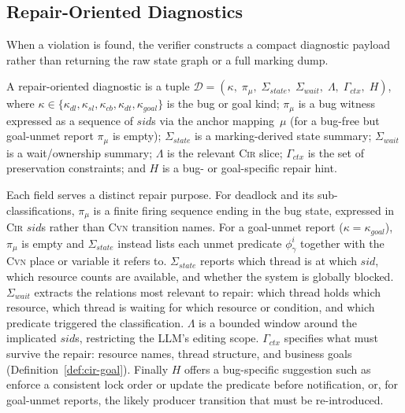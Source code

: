 \subsection{Repair-Oriented Diagnostics}
\label{subsec:counterexample}

When a violation is found, the verifier constructs a compact diagnostic
payload rather than returning the raw state graph or a full marking
dump.

\begin{definition}
\label{def:diagnostic}
A repair-oriented diagnostic is a tuple
$\mathcal{D}=(\kappa,\;\pi_{\mu},\;\Sigma_{\mathit{state}},\;
  \Sigma_{\mathit{wait}},\;\Lambda,\;\Gamma_{\mathit{ctx}},\;H)$,
where
$\kappa\in\{\kappa_{dl},\kappa_{sl},\kappa_{cb},\kappa_{dt},\kappa_{goal}\}$
is the bug or goal kind;
$\pi_{\mu}$ is a bug witness expressed as a sequence of
$\mathit{sid}$s via the anchor mapping~$\mu$ (for a bug-free but
goal-unmet report $\pi_{\mu}$ is empty);
$\Sigma_{\mathit{state}}$ is a marking-derived state summary;
$\Sigma_{\mathit{wait}}$ is a wait/ownership summary;
$\Lambda$ is the relevant \textsc{Cir} slice;
$\Gamma_{\mathit{ctx}}$ is the set of preservation constraints;
and $H$ is a bug- or goal-specific repair hint.
\end{definition}

Each field serves a distinct repair purpose.
For deadlock and its sub-classifications, $\pi_{\mu}$ is a finite firing
sequence ending in the bug state, expressed in \textsc{Cir}
$\mathit{sid}$s rather than \textsc{Cvn} transition names. For a
goal-unmet report ($\kappa=\kappa_{goal}$), $\pi_{\mu}$ is empty and
$\Sigma_{\mathit{state}}$ instead lists each unmet predicate
$\phi_{\gamma}^{i}$ together with the \textsc{Cvn} place or variable it
refers to. $\Sigma_{\mathit{state}}$ reports which thread is at which
$\mathit{sid}$, which resource counts are available, and whether the
system is globally blocked. $\Sigma_{\mathit{wait}}$ extracts the
relations most relevant to repair: which thread holds which resource,
which thread is waiting for which resource or condition, and which
predicate triggered the classification. $\Lambda$ is a bounded window
around the implicated $\mathit{sid}$s, restricting the LLM's editing
scope. $\Gamma_{\mathit{ctx}}$ specifies what must survive the repair:
resource names, thread structure, and business goals
(Definition~\ref{def:cir-goal}). Finally $H$ offers a
bug-specific suggestion such as enforce a consistent lock order or update
the predicate before notification, or, for goal-unmet reports, the
likely producer transition that must be re-introduced.

